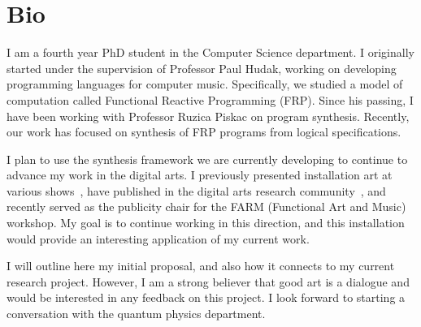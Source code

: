 \section{Bio}

I am a fourth year PhD student in the Computer Science department.
I originally started under the supervision of Professor Paul Hudak, working on developing programming languages for computer music.
Specifically, we studied a model of computation called Functional Reactive Programming (FRP).
Since his passing, I have been working with Professor Ruzica Piskac on program synthesis.
Recently, our work has focused on synthesis of FRP programs from logical specifications.

I plan to use the synthesis framework we are currently developing to continue to advance my work in the digital arts.
I previously presented installation art at various shows~\cite{gls,isosteeple}, have published in the digital arts research community~\cite{ICMC2015, FARM2015}, and recently served as the publicity chair for the FARM (Functional Art and Music) workshop.
My goal is to continue working in this direction, and this installation would provide an interesting application of my current work.

I will outline here my initial proposal, and also how it connects to my current research project.
However, I am a strong believer that good art is a dialogue and would be interested in any feedback on this project.
I look forward to starting a conversation with the quantum physics department.
